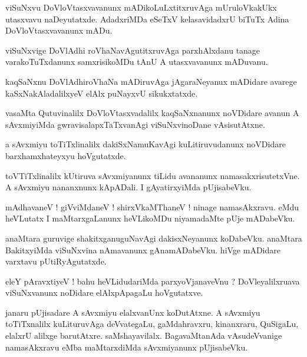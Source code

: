 \documentclass{article}
\begin{document}
\begin{mn}%
viSuNxvu DoVloVtasxvavanunx mADikoLuLxtitxruvAga mUruloVkakUkx utasxvavu naDeyutatxde. AdadxriMDa 
eSeTxV kelasavidadxrU biTuTx Adina DoVloVtasxvavanunx mADu.
\end{mn}

\begin{mn}%
viSuNxvige DoVlAdhi roVhaNavAgutitxruvAga parxhAlxdanu tanage varakoTuTxdanunx samxrisikoMDu tAnU A 
utasxvavanunx mADuvanu.
\end{mn}

\begin{mn}%
kaqSaNxnu DoVlAdhiroVhaNa mADiruvAga jAgaraNeyanux mADidare avarege kaSxNakAladalilxyeV elAlx 
puNayxvU sikukxtatxde.
\end{mn}

\begin{mn}%
vasaMta Qutuvinalilx DoVloVtasxvadalilx kaqSaNxnanunx noVDidare avanun A sAvxmiyiMda 
gwravisalapxTaTxvanAgi viSuNxvinoDane vAsisutAtxne.
\end{mn}

\begin{mn}%
a sAvxmiyu toTiTxlinalilx dakiSxNamuKavAgi kuLitiruvudanunx noVDidare barxhamxhateyxyu hoVgutatxde.
\end{mn}

\begin{mn}%
toVTiTxlinalilx kUtiruva sAvxmiyanunx tiLidu avananunx namasakxrisutetxVne. A sAvxmiyu nananxnunx 
kApADali. I gAyatirxyiMda pUjisabeVku.
\end{mn}

\begin{mn}%
mAdhavaneV ! giVviMdaneV ! shirxVkaMThaneV ! ninage namasAkxravu. eMdu heVLutatx I maMtarxgaLanunx 
heVLikoMDu niyamadaMte pUje mADabeVku.
\end{mn}

\begin{mn}%
anaMtara guruvige shakitxganuguNavAgi dakisxNeyanunx koDabeVku. anaMtara BakitxyiMda viSuNxvina 
nAmavanunx gAnamADabeVku. hiVge mADidare varxtavu pUtiRyAgutatxde.
\end{mn}

\begin{mn}%
eleY pAravxtiyeV ! bahu heVLidudariMda parxyoVjanaveVnu ? DoVleyalilxruava viSuNxvanunx noDidare 
elAlxpApagaLu hoVgutatxve.
\end{mn}

\begin{mn}%
janaru pUjisadare A sAvxmiyu elalxvanUnx koDutAtxne. A sAvxmiyu toTiTxnalilx kuLituruvAga 
deVvategaLu, gaMdahravxru, kinanxraru, QuSigaLu, elalxrU alilxge barutAtxre. saMshayavilalx. 
BagavaMtanAda vAsudeVvanige namasAkxravu eMba maMtarxdiMda sAvxmiyanunx pUjisabeVku.
\end{mn}
\end{document}
